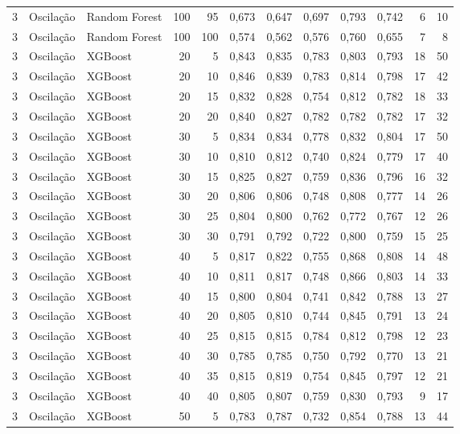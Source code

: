 \begin{longtable}{@{}rllrrrrrrrrr@{}}
3 & Oscilação & Random Forest & 100 & 95 & 0,673 & 0,647 & 0,697 & 0,793 & 0,742 & 6 & 10 \\
3 & Oscilação & Random Forest & 100 & 100 & 0,574 & 0,562 & 0,576 & 0,760 & 0,655 & 7 & 8 \\
3 & Oscilação & XGBoost & 20 & 5 & 0,843 & 0,835 & 0,783 & 0,803 & 0,793 & 18 & 50 \\
3 & Oscilação & XGBoost & 20 & 10 & 0,846 & 0,839 & 0,783 & 0,814 & 0,798 & 17 & 42 \\
3 & Oscilação & XGBoost & 20 & 15 & 0,832 & 0,828 & 0,754 & 0,812 & 0,782 & 18 & 33 \\
3 & Oscilação & XGBoost & 20 & 20 & 0,840 & 0,827 & 0,782 & 0,782 & 0,782 & 17 & 32 \\
3 & Oscilação & XGBoost & 30 & 5 & 0,834 & 0,834 & 0,778 & 0,832 & 0,804 & 17 & 50 \\
3 & Oscilação & XGBoost & 30 & 10 & 0,810 & 0,812 & 0,740 & 0,824 & 0,779 & 17 & 40 \\
3 & Oscilação & XGBoost & 30 & 15 & 0,825 & 0,827 & 0,759 & 0,836 & 0,796 & 16 & 32 \\
3 & Oscilação & XGBoost & 30 & 20 & 0,806 & 0,806 & 0,748 & 0,808 & 0,777 & 14 & 26 \\
3 & Oscilação & XGBoost & 30 & 25 & 0,804 & 0,800 & 0,762 & 0,772 & 0,767 & 12 & 26 \\
3 & Oscilação & XGBoost & 30 & 30 & 0,791 & 0,792 & 0,722 & 0,800 & 0,759 & 15 & 25 \\
3 & Oscilação & XGBoost & 40 & 5 & 0,817 & 0,822 & 0,755 & 0,868 & 0,808 & 14 & 48 \\
3 & Oscilação & XGBoost & 40 & 10 & 0,811 & 0,817 & 0,748 & 0,866 & 0,803 & 14 & 33 \\
3 & Oscilação & XGBoost & 40 & 15 & 0,800 & 0,804 & 0,741 & 0,842 & 0,788 & 13 & 27 \\
3 & Oscilação & XGBoost & 40 & 20 & 0,805 & 0,810 & 0,744 & 0,845 & 0,791 & 13 & 24 \\
3 & Oscilação & XGBoost & 40 & 25 & 0,815 & 0,815 & 0,784 & 0,812 & 0,798 & 12 & 23 \\
3 & Oscilação & XGBoost & 40 & 30 & 0,785 & 0,785 & 0,750 & 0,792 & 0,770 & 13 & 21 \\
3 & Oscilação & XGBoost & 40 & 35 & 0,815 & 0,819 & 0,754 & 0,845 & 0,797 & 12 & 21 \\
3 & Oscilação & XGBoost & 40 & 40 & 0,805 & 0,807 & 0,759 & 0,830 & 0,793 & 9 & 17 \\
3 & Oscilação & XGBoost & 50 & 5 & 0,783 & 0,787 & 0,732 & 0,854 & 0,788 & 13 & 44 \\

\end{longtable}
